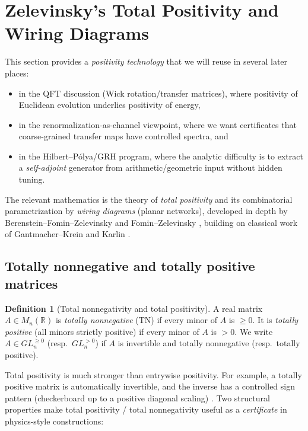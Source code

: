 \documentclass[11pt,oneside]{amsbook}
\numberwithin{equation}{section}
\theoremstyle{plain}
\theoremstyle{definition}
\newtheorem{definition}[theorem]{Definition}
\theoremstyle{remark}
\newcommand{\R}{\mathbb{R}}
\begin{document}
					\section{Zelevinsky's Total Positivity and Wiring Diagrams}
\label{sec:zelevinsky_total_positivity}

This section provides a \emph{positivity technology} that we will reuse in several later places:
\begin{itemize}
\item in the QFT discussion (Wick rotation/transfer matrices), where positivity of Euclidean evolution underlies positivity of energy,
\item in the renormalization-as-channel viewpoint, where we want certificates that coarse-grained transfer maps have controlled spectra, and
\item in the Hilbert--Pólya/GRH program, where the analytic difficulty is to extract a \emph{self-adjoint} generator from arithmetic/geometric input without hidden tuning.
\end{itemize}
The relevant mathematics is the theory of \emph{total positivity} and its combinatorial parametrization by \emph{wiring diagrams} (planar networks), developed in depth by
Berenstein--Fomin--Zelevinsky and Fomin--Zelevinsky \cite{BFZ1996TotallyPositive,FominZelevinsky2000TotalPositivity}, building on classical work of Gantmacher--Krein and Karlin \cite{Karlin1968TotalPositivity,Pinkus1996TotallyPositive}.

\subsection{Totally nonnegative and totally positive matrices}

\begin{definition}[Total nonnegativity and total positivity]
A real matrix $A\in M_n(\R)$ is \emph{totally nonnegative} (TN) if every minor of $A$ is $\ge 0$.
It is \emph{totally positive} (all minors strictly positive) if every minor of $A$ is $>0$.
We write $A\in GL_n^{\ge 0}$ (resp.\ $GL_n^{>0}$) if $A$ is invertible and totally nonnegative (resp.\ totally positive).
\end{definition}

Total positivity is much stronger than entrywise positivity.
For example, a totally positive matrix is automatically invertible, and the inverse has a controlled sign pattern (checkerboard up to a positive diagonal scaling) \cite[Ch.\ 1--2]{Pinkus1996TotallyPositive}.
Two structural properties make total positivity / total nonnegativity useful as a \emph{certificate} in physics-style constructions:
\end{document}
